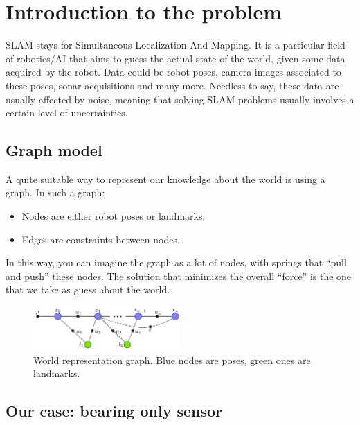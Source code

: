 \chapter{Introduction to the problem}
SLAM stays for Simultaneous Localization And Mapping. It is a particular field of robotics/AI that aims to guess the actual state of the world, given some data acquired by the robot.
Data could be robot poses, camera images associated to these poses, sonar acquisitions and many more.
Needless to say, these data are usually affected by noise, meaning that solving SLAM problems usually involves a certain level of uncertainties.

\section{Graph model}
A quite suitable way to represent our knowledge about the world is using a graph.
In such a graph:
\begin{itemize}
  \item Nodes are either robot poses or landmarks.
  \item Edges are constraints between nodes.
\end{itemize}
In this way, you can imagine the graph as a lot of nodes, with springs that ``pull and push'' these nodes.
The solution that minimizes the overall ``force'' is the one that we take as guess about the world.

\begin{figure}[htbp]
  \centering
    \includegraphics[width=0.5\textwidth]{images/graph.png}
  \caption{World representation graph. Blue nodes are poses, green ones are landmarks.}
\end{figure}

\section{Our case: bearing only sensor}
